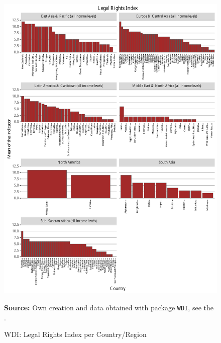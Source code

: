 \begin{figure}[H]
\begin{center}
\caption{WDI: Legal Rights Index per Country/Region}
\label{fig_wdi_legal}
\includegraphics[max height=.9\textheight]{../img/wdi_legal_rights_index.pdf}
\end{center}
\noindent \footnotesize{\textbf{Source:} Own creation and data obtained with package \texttt{WDI}, see the \cite{wb_r}.}
\end{figure}

